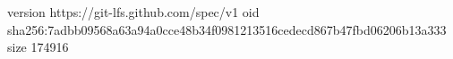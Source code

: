 version https://git-lfs.github.com/spec/v1
oid sha256:7adbb09568a63a94a0cce48b34f0981213516cedecd867b47fbd06206b13a333
size 174916
